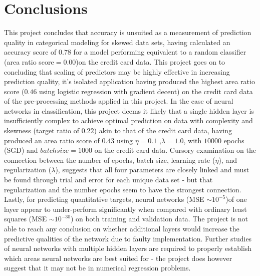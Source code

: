 \documentclass[%
oneside,                 %
final,                   %
10pt]{article}
\begin{document}
\section{Conclusions} \label{Section_Conclusions}
This project concludes that accuracy is unsuited as a measurement of prediction quality in categorical modeling for skewed data sets, having calculated an accuracy score of $0.78$ for a model performing equivalent to a random classifier (area ratio score$=0.00$)on the credit card data. This project goes on to concluding that scaling of predictors may be highly effective in increasing prediction quality, it's isolated application having produced the highest area ratio score ($0.46$ using logistic regression with gradient decent) on the credit card data of the pre-processing methods applied in this project. In the case of neural networks in classification, this project deems it likely that a single hidden layer is insufficiently complex to achieve optimal prediction on data with complexity and skewness (target ratio of $0.22$) akin to that of the credit card data, having produced an area ratio score of $0.43$ using $\eta=0.1$ ,$\lambda=1.0$, with $10000$ epochs (SGD) and $batch size=1000$ on the credit card data. Cursory examination on the connection between the number of epochs, batch size, learning rate ($\eta$), and regularization ($\lambda$), suggests that all four parameters are closely linked and must be found through trial and error for each unique data set - but that regularization and the number epochs seem to have the strongest connection. Lastly, for predicting quantitative targets, neural networks (MSE $\sim   10^{-5} $)of one layer appear to under-perform significantly when compared with ordinary least squares (MSE $ \sim  10^{-30} $) on both training and validation data. The project is not able to reach any conclusion on whether additional layers would increase the predictive qualities of the network due to faulty implementation. Further studies of neural networks with multiple hidden layers are required to properly establish which areas neural networks are best suited for - the project does however suggest that it may not be in numerical regression problems.

 \label{refer}

\end{document}
